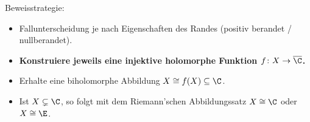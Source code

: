 \begin{frame}
    Beweisstrategie: 
    \begin{itemize}
        \item Fallunterscheidung je nach Eigenschaften des Randes (positiv berandet / nullberandet).
        \item \textbf{Konstruiere jeweils eine injektive holomorphe Funktion $f\colon X \to \overline{\C}$.}
        \item Erhalte eine biholomorphe Abbildung $X \cong f(X) \subseteq \C$. 
        \item Ist $X \subsetneq \C$, so folgt mit dem Riemann'schen Abbildungssatz $X \cong \C$ oder $X\cong \E$.
    \end{itemize}
\end{frame}